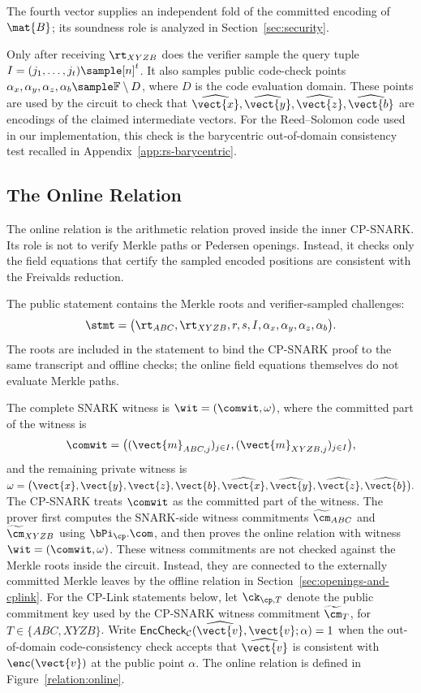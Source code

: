 The fourth vector supplies an independent fold of the committed encoding of
\(\mat{B}\); its soundness role is analyzed in Section~\ref{sec:security}.

Only after receiving \(\rt_{XYZB}\) does the verifier sample the query tuple
{\footnotesize \(I=(j_1,\ldots,j_t)\sample [n]^t\).}
It also samples public code-check points
{\footnotesize
\(\alpha_x,\alpha_y,\alpha_z,\alpha_b\sample\mathbb{F}\setminus D\),
}
where \(D\) is the
code evaluation domain. These points are used by the circuit to check that
{\footnotesize
\(\widehat{\vect{x}},\widehat{\vect{y}},\widehat{\vect{z}},
\widehat{\vect{b}}\)
}
are encodings of
the claimed intermediate vectors. For the Reed--Solomon code used in our
implementation, this check is the barycentric out-of-domain consistency test
recalled in Appendix~\ref{app:rs-barycentric}.


\subsection{The Online Relation}
\label{sec:snark-relation}
The online relation is the arithmetic relation proved inside the
inner CP-SNARK.  Its role is not to verify Merkle paths or Pedersen openings.
Instead, it checks only the field equations that certify the sampled encoded
positions are consistent with the Freivalds reduction.

The public statement contains the Merkle roots and verifier-sampled
challenges:
\[
\stmt = \big( \rt_{ABC},\rt_{XYZB},r,s,I,\alpha_x,\alpha_y,\alpha_z,\alpha_b
  \big).
\]
The roots are included in the statement to bind the CP-SNARK proof to the same
transcript and offline checks; the online field equations themselves do not
evaluate Merkle paths.

The complete SNARK witness is
  $\wit=(\comwit,\omega)$,
where the committed part of the witness is
\[
\comwit = \big( (\vect{m}_{ABC,j})_{j\in I},(\vect{m}_{XYZB,j})_{j\in I} \big),
\]
and the remaining private witness is
  $\omega
  =
  \big(
    \vect{x},\vect{y},\vect{z},\vect{b},
    \widehat{\vect{x}},\widehat{\vect{y}},\widehat{\vect{z}},
    \widehat{\vect{b}}
  \big).$
The CP-SNARK treats \(\comwit\) as the committed part of the witness.  The
prover first computes the SNARK-side witness commitments
\(\widetilde{\cm}_{ABC}\) and \(\widetilde{\cm}_{XYZB}\) using
\(\bPi_{\cp}.\com\), and then proves the online relation with witness
\(\wit=(\comwit,\omega)\).  These witness commitments are not checked against
the Merkle roots inside the circuit.  Instead, they are connected to the
externally committed Merkle leaves by the offline relation in
Section~\ref{sec:openings-and-cplink}.
For the CP-Link statements below, let \(\ck_{\cp,T}\) denote the public
commitment key used by the CP-SNARK witness commitment
\(\widetilde{\cm}_{T}\), for \(T\in\{ABC,XYZB\}\).
Write
  $\mathsf{EncCheck}_{\mathcal{C}}(\widehat{\vect{v}},\vect{v};\alpha)=1$
when the out-of-domain code-consistency check accepts that
\(\widehat{\vect{v}}\) is consistent with \(\enc(\vect{v})\) at the public
point \(\alpha\).  The online relation is defined in
Figure~\ref{relation:online}.

